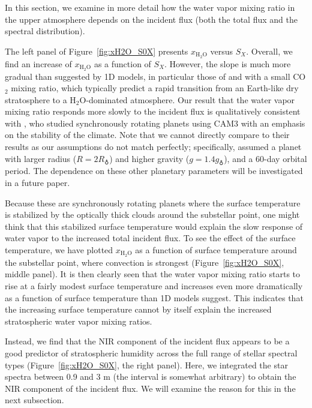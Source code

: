 \documentclass[11pt,numberedappendix,twocolappendix,]{emulateapj}
\def\water{H$_2$O}
\def\xwater{$x_\text{\water}$}
\def\wv{water vapor}
\def\revise#1{{\color{red}{#1}}}
\begin{document}
In this section, we examine in more detail how the \wv{} mixing ratio in the upper atmosphere depends on the incident flux (both the total flux and the spectral distribution). 

The left panel of Figure~\ref{fig:xH2O_S0X} presents \xwater{} versus $S_X$. 
Overall, we find an increase of \xwater{} as a function of $S_X$. 
However, the slope is much more gradual than suggested by 1D models, in particular those  of \citet{Kasting1993} and \citet{Wordsworth2013} with a small CO$_2$ mixing ratio, which typically predict a rapid transition from an Earth-like dry stratosphere to a \water{}-dominated atmosphere. 
Our result that the \wv{} mixing ratio responds more slowly to the incident flux is qualitatively consistent with \citet{Yang2013}, who studied synchronously rotating planets using CAM3 with an emphasis on the stability of the climate. 
Note that we cannot directly compare to their results as our assumptions do not match perfectly; specifically, \cite{Yang2013} assumed a planet with larger radius ($R=2R_\earth$) and higher gravity ($g=1.4g_\earth$), and a 60-day orbital period. 
The dependence on these other planetary parameters will be investigated in a future paper. 

Because these are synchronously rotating planets where the surface temperature is stabilized by the optically thick clouds around the substellar point, one might think that this stabilized surface temperature would explain the slow  response of \wv{} to the increased total incident flux. 
To see the effect of the surface temperature, we have plotted \xwater{} as a function of surface temperature around the substellar point, where convection is strongest (Figure~\ref{fig:xH2O_S0X}, middle panel). 
It is then clearly seen that the \wv{}  mixing ratio starts to rise at a fairly modest surface temperature and increases even more dramatically as a function of surface temperature than 1D models suggest. 
This indicates that the increasing surface temperature cannot by itself explain the increased stratospheric \wv{} mixing ratios. %

Instead, we find that the \revise{near-infrared (}NIR\revise{)} component of the incident flux appears to be a good predictor of stratospheric humidity across the full range of stellar spectral types (Figure~\ref{fig:xH2O_S0X}, the right panel). %
Here, we integrated the star spectra between 0.9 and 3 \textmu m (the interval is somewhat arbitrary) to obtain the NIR component of the incident flux. %
We will examine the reason for this in the next subsection.
 
\end{document}
